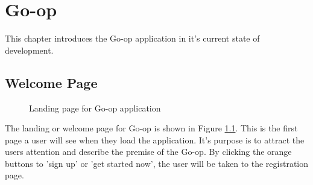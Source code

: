 
\chapter{Go-op} %
\label{Goop} %

This chapter introduces the Go-op application in it's current state of development.

\section{Welcome Page}
\begin{figure}
\centering
{}
\decoRule
\caption[Go-op Welcome Page]{Landing page for Go-op application}
\label{fig:welpage}
\end{figure}

The landing or welcome page for Go-op is shown in Figure \ref{fig:welpage}. This is the first page a user will see when they load the application. It's purpose is to attract the users attention and describe the premise of the Go-op. By clicking the orange buttons to 'sign up' or 'get started now', the user will be taken to the registration page.\\

